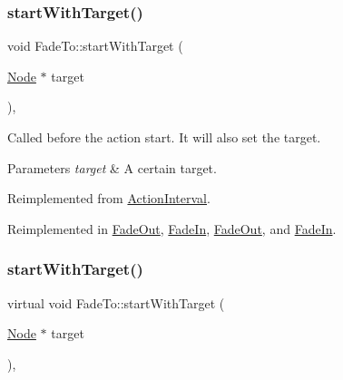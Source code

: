 \mbox{\label{classFadeTo_a7846758ff3760d099ca70c279c52bde0}} 
\subsubsection{\texorpdfstring{start\+With\+Target()}{startWithTarget()}\hspace{0.1cm}{\footnotesize\ttfamily [1/2]}}
{\footnotesize\ttfamily void Fade\+To\+::start\+With\+Target (\begin{DoxyParamCaption}\item[{\hyperlink{classNode}{Node} $\ast$}]{target }\end{DoxyParamCaption})\hspace{0.3cm}{\ttfamily [override]}, {\ttfamily [virtual]}}

Called before the action start. It will also set the target.


\begin{DoxyParams}{Parameters}
{\em target} & A certain target. \\
\hline
\end{DoxyParams}


Reimplemented from \hyperlink{classActionInterval_ad3d91186b2c3108488ddbbdbbd982484}{Action\+Interval}.



Reimplemented in \hyperlink{classFadeOut_a95f4db5b66b8fea0e41ae9da60c3e730}{Fade\+Out}, \hyperlink{classFadeIn_ad97831da7a732a749d87634343e1711d}{Fade\+In}, \hyperlink{classFadeOut_a41e8895429e5942e43b3a60c117e0a2b}{Fade\+Out}, and \hyperlink{classFadeIn_a3a1c5c7aa1b80845aceeeb06ed059fad}{Fade\+In}.

\mbox{\label{classFadeTo_a80f8df2c2e9e4755c8ecf076e0d3f71c}} 
\subsubsection{\texorpdfstring{start\+With\+Target()}{startWithTarget()}\hspace{0.1cm}{\footnotesize\ttfamily [2/2]}}
{\footnotesize\ttfamily virtual void Fade\+To\+::start\+With\+Target (\begin{DoxyParamCaption}\item[{\hyperlink{classNode}{Node} $\ast$}]{target }\end{DoxyParamCaption})\hspace{0.3cm}{\ttfamily [override]}, {\ttfamily [virtual]}}

